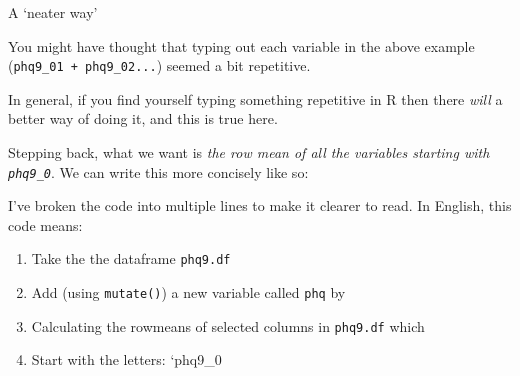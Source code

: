 \documentclass[]{article}
\newenvironment{Shaded}{\begin{snugshade}}{\end{snugshade}}
\newcommand{\KeywordTok}[1]{\textcolor[rgb]{0.13,0.29,0.53}{\textbf{#1}}}
\newcommand{\DataTypeTok}[1]{\textcolor[rgb]{0.13,0.29,0.53}{#1}}
\newcommand{\StringTok}[1]{\textcolor[rgb]{0.31,0.60,0.02}{#1}}
\newcommand{\OperatorTok}[1]{\textcolor[rgb]{0.81,0.36,0.00}{\textbf{#1}}}
\newcommand{\NormalTok}[1]{#1}
\providecommand{\tightlist}{%
  \setlength{\itemsep}{0pt}\setlength{\parskip}{0pt}}
\theoremstyle{definition}
\theoremstyle{definition}
\theoremstyle{definition}
\theoremstyle{remark}
\begin{document}
A `neater way'

You might have thought that typing out each variable in the above
example (\texttt{phq9\_01\ +\ phq9\_02...}) seemed a bit repetitive.

In general, if you find yourself typing something repetitive in R then
there \emph{will} a better way of doing it, and this is true here.

Stepping back, what we want is \emph{the row mean of all the variables
starting with \texttt{phq9\_0}}. We can write this more concisely like
so:

\begin{Shaded}
\end{Shaded}

I've broken the code into multiple lines to make it clearer to read. In
English, this code means:

\begin{enumerate}
\def\labelenumi{\arabic{enumi}.}
\tightlist
\item
  Take the the dataframe \texttt{phq9.df}
\item
  Add (using \texttt{mutate()}) a new variable called \texttt{phq} by
\item
  Calculating the rowmeans of selected columns in \texttt{phq9.df} which
\item
  Start with the letters: `phq9\_0
\end{enumerate}
\end{document}
